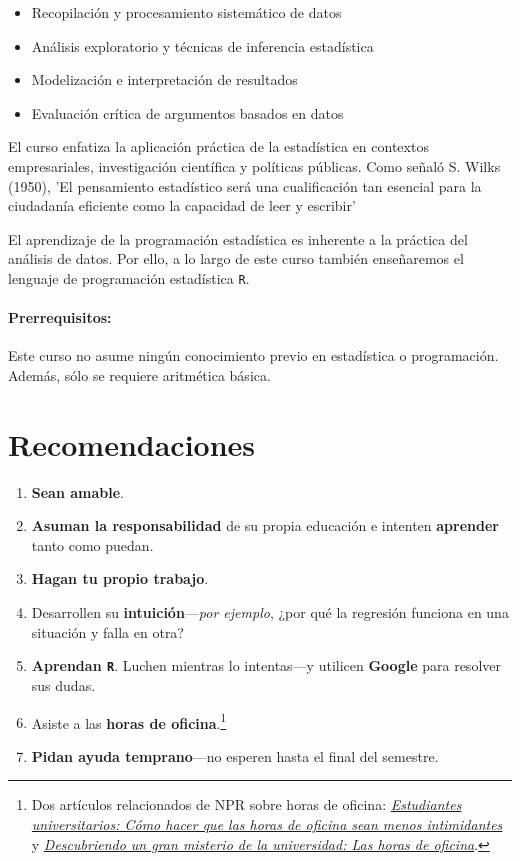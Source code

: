 \documentclass[10pt]{article}
\begin{document}
\begin{itemize}
\item Recopilación y procesamiento sistemático de datos
\item Análisis exploratorio y técnicas de inferencia estadística
\item Modelización e interpretación de resultados
\item Evaluación crítica de argumentos basados en datos
\end{itemize}


El curso enfatiza la aplicación práctica de la estadística en contextos empresariales, investigación científica y políticas públicas. Como señaló S. Wilks (1950), 'El pensamiento estadístico será una cualificación tan esencial para la ciudadanía eficiente como la capacidad de leer y escribir'

El aprendizaje de la programación estadística es inherente a la práctica del análisis de datos. Por ello, a lo largo de este curso también enseñaremos el lenguaje de programación estadística \texttt{{R}}.

\paragraph{Prerrequisitos:} Este curso no asume ningún conocimiento previo en estadística o programación. Además, sólo se requiere aritmética básica.


\section*{Recomendaciones}

\begin{enumerate}
	\item \textbf{Sean amable}.
	\item \textbf{Asuman la responsabilidad} de su propia educación e intenten \textbf{aprender} tanto como puedan.
	\item \textbf{Hagan tu propio trabajo}.
	\item Desarrollen su \textbf{intuición}---\textit{por ejemplo}, ¿por qué la regresión funciona en una situación y falla en otra?
	\item \textbf{Aprendan \texttt{R}}. Luchen mientras lo intentas---y utilicen \textbf{Google} para resolver sus dudas.
	\item Asiste a las \textbf{horas de oficina}.\footnote{Dos artículos relacionados de NPR sobre horas de oficina: \href{https://www.npr.org/2019/10/05/678815966/college-students-how-to-make-office-hours-less-scary}{\textit{Estudiantes universitarios: Cómo hacer que las horas de oficina sean menos intimidantes}} y \href{https://www.npr.org/2019/10/02/766568824/uncovering-a-huge-mystery-of-college-office-hours}{\textit{Descubriendo un gran misterio de la universidad: Las horas de oficina}}.}
	\item \textbf{Pidan ayuda temprano}---no esperen hasta el final del semestre.
\end{enumerate}
\end{document}
